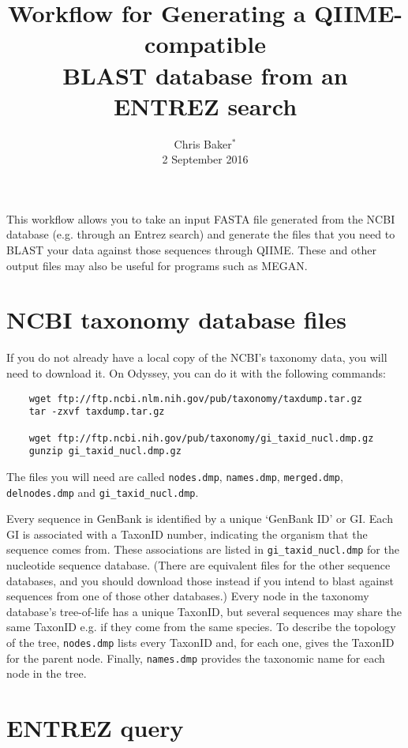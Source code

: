 \documentclass[11pt]{amsart}
\title{Workflow for Generating a QIIME-compatible\\BLAST database from an ENTREZ search}
\author{Chris Baker$^*$\\2 September 2016}
\begin{document}
\maketitle

\thispagestyle{fancy}

This workflow allows you to take an input FASTA file generated from the NCBI database (e.g. through an Entrez search) and generate the files that you need to BLAST your data against those sequences through QIIME. These and other output files may also be useful for programs such as MEGAN.

\section{NCBI taxonomy database files}
\label{section:taxonomy}

If you do not already have a local copy of the NCBI's taxonomy data, you will need to download it. On Odyssey, you can do it with the following commands:

\begin{verbatim}
    wget ftp://ftp.ncbi.nlm.nih.gov/pub/taxonomy/taxdump.tar.gz
    tar -zxvf taxdump.tar.gz
    
    wget ftp://ftp.ncbi.nih.gov/pub/taxonomy/gi_taxid_nucl.dmp.gz
    gunzip gi_taxid_nucl.dmp.gz
\end{verbatim}

The files you will need are called \verb|nodes.dmp|, \verb|names.dmp|, \verb|merged.dmp|, \verb|delnodes.dmp| and \linebreak \verb|gi_taxid_nucl.dmp|.

Every sequence in GenBank is identified by a unique `GenBank ID' or GI. Each GI is associated with a TaxonID number, indicating the organism that the sequence comes from. These associations are listed in \verb|gi_taxid_nucl.dmp| for the nucleotide sequence database. (There are equivalent files for the other sequence databases, and you should download those instead if you intend to blast against sequences from one of those other databases.) Every node in the taxonomy database's tree-of-life has a unique TaxonID, but several sequences may share the same TaxonID e.g. if they come from the same species. To describe the topology of the tree, \verb|nodes.dmp| lists every TaxonID and, for each one, gives the TaxonID for the parent node. Finally, \verb|names.dmp| provides the taxonomic name for each node in the tree.

\section{ENTREZ query}
\label{section:entrez}
\end{document}
